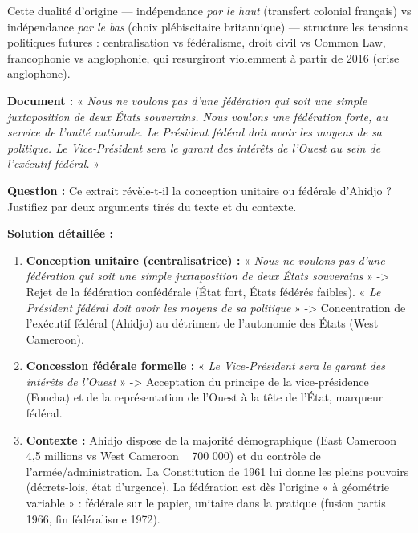 \documentclass[11pt]{article}
\begin{document}
Cette dualité d'origine — indépendance \emph{par le haut} (transfert colonial français) vs indépendance \emph{par le bas} (choix plébiscitaire britannique) — structure les tensions politiques futures : centralisation vs fédéralisme, droit civil vs Common Law, francophonie vs anglophonie, qui resurgiront violemment à partir de 2016 (crise anglophone).

\begin{exoresolu}
\textbf{Document :} « \emph{Nous ne voulons pas d'une fédération qui soit une simple juxtaposition de deux États souverains. Nous voulons une fédération forte, au service de l'unité nationale. Le Président fédéral doit avoir les moyens de sa politique. Le Vice-Président sera le garant des intérêts de l'Ouest au sein de l'exécutif fédéral.} »

\textbf{Question :} Ce extrait révèle-t-il la conception unitaire ou fédérale d'Ahidjo ? Justifiez par deux arguments tirés du texte et du contexte.

\textbf{Solution détaillée :}
\begin{enumerate}
\item \textbf{Conception unitaire (centralisatrice) :} « \emph{Nous ne voulons pas d'une fédération qui soit une simple juxtaposition de deux États souverains} » -> Rejet de la fédération confédérale (État fort, États fédérés faibles). « \emph{Le Président fédéral doit avoir les moyens de sa politique} » -> Concentration de l'exécutif fédéral (Ahidjo) au détriment de l'autonomie des États (West Cameroon).
\item \textbf{Concession fédérale formelle :} « \emph{Le Vice-Président sera le garant des intérêts de l'Ouest} » -> Acceptation du principe de la vice-présidence (Foncha) et de la représentation de l'Ouest à la tête de l'État, marqueur fédéral.
\item \textbf{Contexte :} Ahidjo dispose de la majorité démographique (East Cameroon ~ 4,5 millions vs West Cameroon ~ 700 000) et du contrôle de l'armée/administration. La Constitution de 1961 lui donne les pleins pouvoirs (décrets-lois, état d'urgence). La fédération est dès l'origine « à géométrie variable » : fédérale sur le papier, unitaire dans la pratique (fusion partis 1966, fin fédéralisme 1972).
\end{enumerate}
\end{exoresolu}
\end{document}
